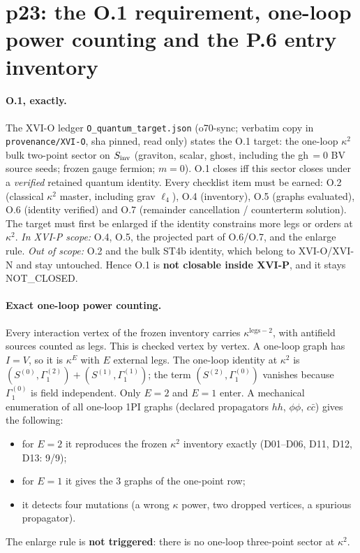 \section{p23: the O.1 requirement, one-loop power counting and the P.6 entry inventory}
\label{sec:p23-o1}

\paragraph{O.1, exactly.} The XVI-O ledger \texttt{O\_quantum\_target.json} (o70-sync; verbatim copy in
\texttt{provenance/XVI-O}, sha pinned, read only) states the O.1 target: the one-loop $\kappa^2$ bulk two-point sector
on $S_{\rm inv}$ (graviton, scalar, ghost, including the gh$\,=0$ BV source seeds; frozen gauge fermion; $m=0$).
O.1 closes iff this sector closes under a \emph{verified} retained quantum identity. Every checklist item must be
earned: O.2 (classical $\kappa^2$ master, including grav $\ell_4$), O.4 (inventory), O.5 (graphs evaluated), O.6
(identity verified) and O.7 (remainder cancellation / counterterm solution). The target must first be enlarged if the
identity constrains more legs or orders at $\kappa^2$.
\emph{In XVI-P scope:} O.4, O.5, the projected part of O.6/O.7, and the enlarge rule.
\emph{Out of scope:} O.2 and the bulk ST4b identity, which belong to XVI-O/XVI-N and stay untouched. Hence O.1 is
\textbf{not closable inside XVI-P}, and it stays NOT\_CLOSED.

\paragraph{Exact one-loop power counting.} Every interaction vertex of the frozen inventory carries
$\kappa^{\text{legs}-2}$, with antifield sources counted as legs. This is checked vertex by vertex. A one-loop graph
has $I=V$, so it is $\kappa^{E}$ with $E$ external legs. The one-loop identity at $\kappa^2$ is
$(S^{(0)},\Gamma_1^{(2)})+(S^{(1)},\Gamma_1^{(1)})$; the term $(S^{(2)},\Gamma_1^{(0)})$ vanishes because
$\Gamma_1^{(0)}$ is field independent. Only $E=2$ and $E=1$ enter. A mechanical enumeration of all one-loop 1PI graphs
(declared propagators $hh$, $\phi\phi$, $c\bar c$) gives the following:
\begin{itemize}
\item for $E=2$ it reproduces the frozen $\kappa^2$ inventory exactly (D01--D06, D11, D12, D13: 9/9);
\item for $E=1$ it gives the 3 graphs of the one-point row;
\item it detects four mutations (a wrong $\kappa$ power, two dropped vertices, a spurious propagator).
\end{itemize}
The enlarge rule is \textbf{not triggered}: there is no one-loop three-point sector at $\kappa^2$.

